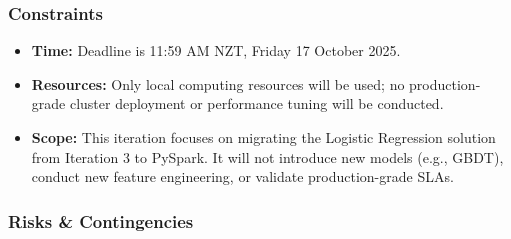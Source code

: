 \documentclass[sigplan,screen]{acmart}
\begin{document}
\subsubsection{Constraints}

\begin{itemize}
\item \textbf{Time:} Deadline is 11:59 AM NZT, Friday 17 October 2025.
\item \textbf{Resources:} Only local computing resources will be used; no production-grade cluster deployment or performance tuning will be conducted.
\item \textbf{Scope:} This iteration focuses on migrating the Logistic Regression solution from Iteration 3 to PySpark. It will not introduce new models (e.g., GBDT), conduct new feature engineering, or validate production-grade SLAs.
\end{itemize}

\subsubsection{Risks \& Contingencies}
\end{document}

